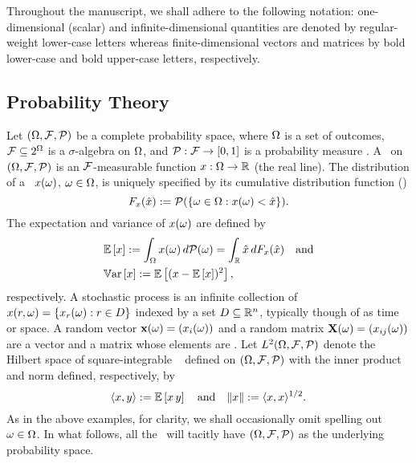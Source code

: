 Throughout the manuscript, we shall adhere to the following notation: one-dimensional (scalar) and infinite-dimensional quantities are denoted by regular-weight lower-case letters whereas finite-dimensional vectors and matrices by bold lower-case and bold upper-case letters, respectively.

\subsection{Probability Theory}
Let $(\Omega, \mathcal{F}, \mathcal{P})$ be a complete probability space, where $\Omega$ is a set of outcomes, $\mathcal{F} \subseteq 2^\Omega$ is a $\sigma$-algebra on $\Omega$, and $\mathcal{P}: \mathcal{F} \to [0, 1]$ is a probability measure \cite{durrett2010}.
A \rv\ on $(\Omega, \mathcal{F}, \mathcal{P})$ is an $\mathcal{F}$-measurable function $x: \Omega \to \mathbb{R}$ (the real line).
The distribution of a \rv\ $x(\omega)$, $\omega \in \Omega$, is uniquely specified by its cumulative distribution function (\cdf)
\begin{equation*}
  F_x(\hat{x}) := \mathcal{P}(\{ \omega \in \Omega: x(\omega) < \hat{x} \}).
\end{equation*}
The expectation and variance of $x(\omega)$ are defined by
\begin{align*}
  & \mathbb{E}\left[ x \right] := \int_\Omega x(\omega) \, d\mathcal{P}(\omega) = \int_{\mathbb{R}} \hat{x} \, d F_x(\hat{x}) \hspace{1em} \text{and} \\
  & \mathbb{V}\text{ar}\left[ x \right] := \mathbb{E}\left[ (x - \mathbb{E}\left[ x \right])^2 \right],
\end{align*}
respectively.
A stochastic process is an infinite collection of \rvs\ $x(r, \omega) = \{ x_r(\omega): r \in D \}$ indexed by a set $D \subseteq \mathbb{R}^n$, typically though of as time or space.
A random vector $\mathbf{x}(\omega) = (x_i(\omega))$ and a random matrix $\mathbf{X}(\omega) = (x_{ij}(\omega))$ are a vector and a matrix whose elements are \rvs.
Let $L^{2}(\Omega, \mathcal{F}, \mathcal{P})$ denote the Hilbert space of square-integrable \rvs\ \cite{janson1997} defined on $(\Omega, \mathcal{F}, \mathcal{P})$ with the inner product and norm defined, respectively, by
\begin{equation*}
  \langle x, y \rangle := \mathbb{E}\left[ x \, y \right] \hspace{1em} \text{and} \hspace{1em} \| x \| := \langle x, x \rangle^{1/2}.
\end{equation*}
As in the above examples, for clarity, we shall occasionally omit spelling out $\omega \in \Omega$.
In what follows, all the \rvs\ will tacitly have $(\Omega, \mathcal{F}, \mathcal{P})$ as the underlying probability space.

